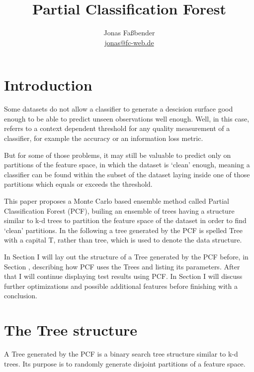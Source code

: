 \documentclass[journal]{IEEEtran}
\title{Partial Classification Forest}
\author{Jonas Fa{\ss}bender \\ [1ex]
  \href{mailto: jonas@fc-web.de}
  {jonas@fc-web.de}}
\date{}
\begin{document}

\maketitle

\begin{abstract}
\end{abstract}

\section{Introduction}

Some datasets do not allow a classifier to generate a
descision surface good enough to be able to predict unseen
observations well enough. Well, in this case, referrs to a
context dependent threshold for any quality measurement of
a classifier, for example the accuracy or an information
loss metric.

But for some of those problems, it may still be valuable
to predict only on partitions of the feature space, in
which the dataset is `clean' enough, meaning a classifier
can be found within the subset of the dataset laying inside
one of those partitions which equals or exceeds the
threshold.

This paper proposes a Monte Carlo based ensemble method
called Partial Classification Forest (PCF), builing an
ensemble of trees having a structure similar to
k-d trees to partition the feature space of the dataset in
order to find `clean' partitions. In the following a
tree generated by the PCF is spelled Tree with a capital
T, rather than tree, which is used to denote the data
structure.

In Section \MakeUppercase{} I will lay out
the structure of a Tree generated by the PCF before, in
Section \MakeUppercase{}, describing how
PCF uses the Trees and listing its parameters. After that I
will continue displaying test results using PCF\@. In
Section \MakeUppercase{} I will discuss
further optimizations and possible additional features
before finishing with a conclusion.

\section{The Tree structure}

A Tree generated by the PCF is a binary search tree
structure similar to k-d trees. Its purpose is to randomly
generate disjoint partitions of a feature space.
\end{document}
